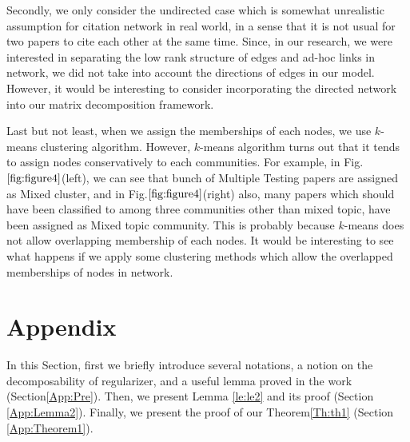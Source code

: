 \documentclass[AMS,STIX1COL]{WileyNJD-v2}
\begin{document}
{Secondly, we only consider the undirected case which is somewhat unrealistic assumption for citation network in real world, in a sense that it is not usual for two papers to cite each other at the same time.
Since, in our research, we were interested in separating the low rank structure of edges and ad-hoc links in network, we did not take into account the directions of edges in our model.
However, it would be interesting to consider incorporating the directed network into our matrix decomposition framework.

Last but not least, when we assign the memberships of each nodes, we use $k$-means clustering algorithm.
However, $k$-means algorithm turns out that it tends to assign nodes conservatively to each communities.
For example, in Fig.$\ref{fig:figure4}$(left), we can see that bunch of Multiple Testing papers are assigned as Mixed cluster, and in Fig.$\ref{fig:figure4}$(right) also, many papers which should have been classified to among three communities other than mixed topic, have been assigned as Mixed topic community.
This is probably because $k$-means does not allow overlapping membership of each nodes.
It would be interesting to see what happens if we apply some clustering methods which allow the overlapped memberships of nodes in network.

\section{Appendix}
In this Section, first we briefly introduce several notations, a notion on the decomposability of regularizer, and a useful lemma proved in the work \cite{agarwal2012noisy} (Section\ref{App:Pre}).
Then, we present Lemma \ref{le:le2} and its proof (Section \ref{App:Lemma2}).
Finally, we present the proof of our Theorem\ref{Th:th1} (Section \ref{App:Theorem1}).

}
\end{document}
